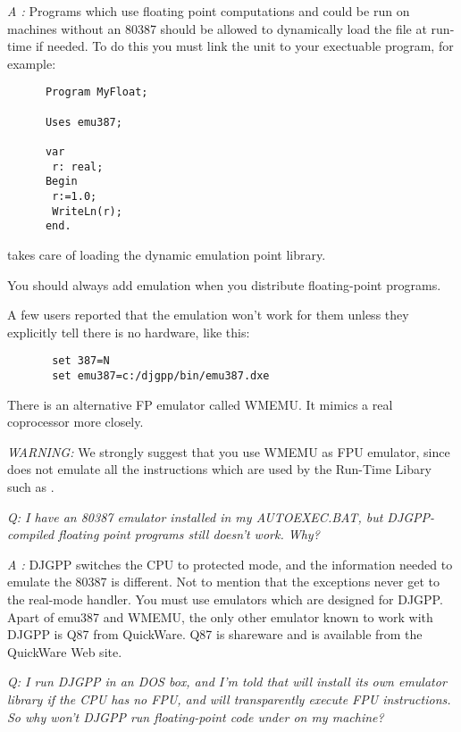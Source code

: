 \documentclass{report}
\begin{document}
{\em A :}
 Programs which use floating point computations and could be run on
   machines without an 80387 should be allowed to dynamically load the
   file at run-time if needed. To do this you must link the  unit to your
   exectuable program, for example:

\begin{verbatim}
      Program MyFloat;

      Uses emu387;

      var
       r: real;
      Begin
       r:=1.0;
       WriteLn(r);
      end.
\end{verbatim}

    takes care of loading the dynamic emulation point library.

   You should always add emulation when you distribute floating-point
   programs.

   A few users reported that the emulation won't work for them unless
   they explicitly tell  there is no  hardware, like this:

\begin{verbatim}
       set 387=N
       set emu387=c:/djgpp/bin/emu387.dxe
\end{verbatim}

   There is an alternative FP emulator called WMEMU. It mimics a real
   coprocessor more closely.

   {\em WARNING:} We strongly suggest that you use WMEMU as FPU emulator, since
    does not emulate all the instructions which are used by the
   Run-Time Libary such as .


{\em   Q: I have an 80387 emulator installed in my AUTOEXEC.BAT, but
   DJGPP-compiled floating point programs still doesn't work. Why?
}


{\em   A :} DJGPP switches the CPU to protected mode, and the information
   needed to emulate the 80387 is different. Not to mention that the
   exceptions never get to the real-mode handler. You must use emulators
   which are designed for DJGPP. Apart of emu387 and WMEMU, the only
   other emulator known to work with DJGPP is Q87 from QuickWare. Q87 is
   shareware and is available from the QuickWare Web site.


{\em   Q: I run DJGPP in an \ostwo DOS box, and I'm told that \ostwo will install
   its own emulator library if the CPU has no FPU, and will transparently
   execute FPU instructions. So why won't DJGPP run floating-point code
   under \ostwo on my machine?
}
\end{document}
